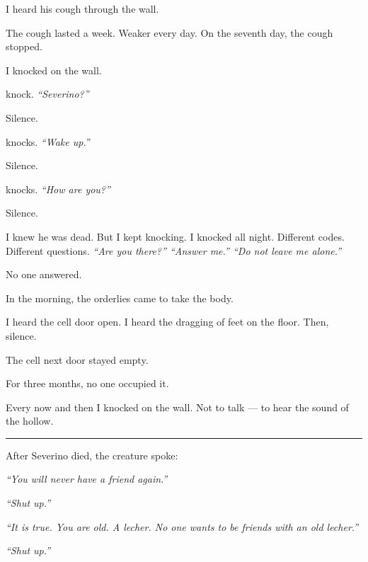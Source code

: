 \noindent I heard his cough through the wall.

\noindent The cough lasted a week. Weaker every day. On the seventh day, the cough stopped.

\noindent I knocked on the wall.

 knock. \textit{\textquotedblleft{}Severino?\textquotedblright{}}

\noindent Silence.

 knocks. \textit{\textquotedblleft{}Wake up.\textquotedblright{}}

\noindent Silence.

 knocks. \textit{\textquotedblleft{}How are you?\textquotedblright{}}

\noindent Silence.

\noindent I knew he was dead. But I kept knocking. I knocked all night. Different codes. Different questions. \textit{\textquotedblleft{}Are you there?\textquotedblright{}\textit{ }\textquotedblleft{}Answer me.\textquotedblright{}\textit{ }\textquotedblleft{}Do not leave me alone.\textquotedblright{}}

\noindent No one answered.

\noindent In the morning, the orderlies came to take the body.

\noindent I heard the cell door open. I heard the dragging of feet on the floor. Then, silence.

\noindent The cell next door stayed empty.

\noindent For three months, no one occupied it.

\noindent Every now and then I knocked on the wall. Not to talk --- to hear the sound of the hollow.

\vspace{0.5em}\noindent\rule{\textwidth}{0.5pt}\vspace{0.5em}

\noindent After Severino died, the creature spoke:

\noindent \textit{\textquotedblleft{}You will never have a friend again.\textquotedblright{}}

\noindent \textit{\textquotedblleft{}Shut up.\textquotedblright{}}

\noindent \textit{\textquotedblleft{}It is true. You are old. A lecher. No one wants to be friends with an old lecher.\textquotedblright{}}

\noindent \textit{\textquotedblleft{}Shut up.\textquotedblright{}}

